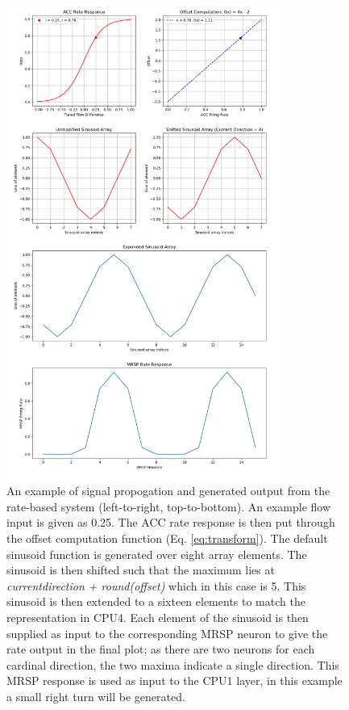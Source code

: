 \documentclass[a4paper,11pt,twoside,openright]{article}
\begin{document}
\begin{figure}[h!]
  \centering
  \vspace{-45pt}
  \includegraphics[width=0.8\textwidth]{NeuralCASignalProp}
  \caption{\label{fig:mrspRateResponse} An example of signal
    propogation and generated output from the rate-based system
    (left-to-right, top-to-bottom). An example flow input is given as
    0.25. The ACC rate response is then put through the offset
    computation function (Eq. \ref{eq:transform}). The default
    sinusoid function is generated over eight array elements. The
    sinusoid is then shifted such that the maximum lies at
    \textit{current\textunderscore direction + round(offset)} which in
    this case is 5. This sinusoid is then extended to a sixteen
    elements to match the representation in CPU4. Each element of the
    sinusoid is then supplied as input to the corresponding MRSP
    neuron to give the rate output in the final plot; as there are two
    neurons for each cardinal direction, the two maxima indicate a
    single direction. This MRSP response is used as input to the CPU1
    layer, in this example a small right turn will be generated.  }
\end{figure}
\end{document}
